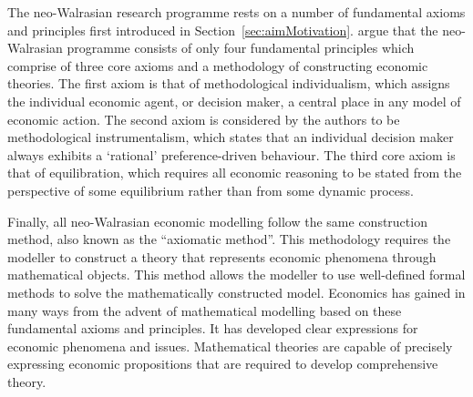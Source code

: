 The neo-Walrasian research programme rests on a number of fundamental axioms and principles first introduced in Section~\ref{sec:aimMotivation}. \citet{Arnsperger2006} argue that the neo-Walrasian programme consists of only four fundamental principles which comprise of three core axioms and a methodology of constructing economic theories. The first axiom is that of methodological individualism, which assigns the individual economic agent, or decision maker, a central place in any model of economic action. The second axiom is considered by the authors to be methodological instrumentalism, which states that an individual decision maker always exhibits a `rational' preference-driven behaviour. The third core axiom is that of equilibration, which requires all economic reasoning to be stated from the perspective of some equilibrium rather than from some dynamic process.

Finally, all neo-Walrasian economic modelling follow the same construction method, also known as the ``axiomatic method''. This methodology requires the modeller to construct a theory that represents economic phenomena through mathematical objects. This method allows the modeller to use well-defined formal methods to solve the mathematically constructed model. Economics has gained in many ways from the advent of mathematical modelling based on these fundamental axioms and principles. It has developed clear expressions for economic phenomena and issues. Mathematical theories are capable of precisely expressing economic propositions that are required to develop comprehensive theory.

